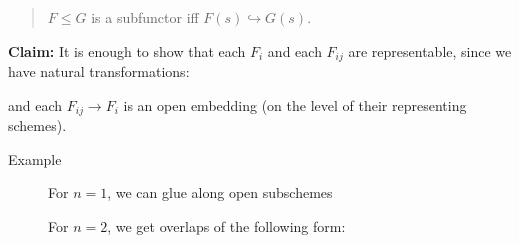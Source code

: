\begin{description}
\begin{quote}
\(F\leq G\) is a subfunctor iff \(F(s) \hookrightarrow G(s)\).
\end{quote}

\textbf{Claim:} It is enough to show that each \(F_i\) and each
\(F_{ij}\) are representable, since we have natural transformations:

\begin{center}
\end{center}

and each \(F_{ij} \to F_i\) is an open embedding (on the level of their
representing schemes).

\begin{description}
\item[Example]
For \(n=1\), we can glue along open subschemes

\begin{center}
\end{center}

For \(n=2\), we get overlaps of the following form:

\begin{center}
\end{center}


\end{description}
\end{description}
